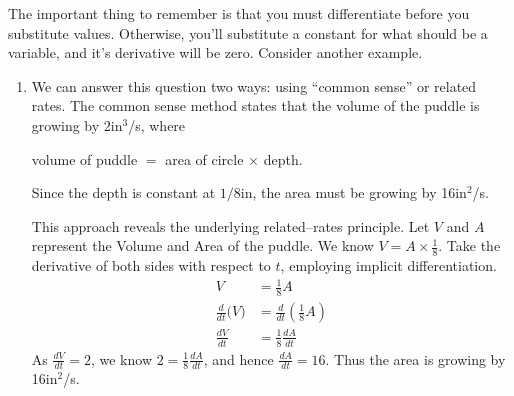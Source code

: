 The important thing to remember is that you must differentiate before you substitute values.  Otherwise, you'll substitute a constant for what should be a variable, and it's derivative will be zero.  Consider another example.\\

{\begin{enumerate}
\item We can answer this question two ways: using ``common sense'' or related rates. The common sense method states that the volume of the puddle is growing by $2$in$^3$/s, where 
	\begin{center} volume of puddle $=$ area of circle $\times$ depth.\end{center}
Since the depth is constant at $1/8$in, the area must be growing by 16in$^2$/s.

This approach reveals the underlying related--rates principle. Let $V$ and $A$ represent the Volume and Area of the puddle. We know $V= A\times \frac18$. Take the derivative of both sides with respect to $t$, employing implicit differentiation.
\begin{align*}
V &= \frac18A\\
\frac{d}{dt}\big(V\big) &= \frac{d}{dt}\left(\frac18A\right)\\
\frac{dV}{dt} &=	\frac18\frac{dA}{dt}
\end{align*} 
As $\frac{dV}{dt} = 2$, we know $2 = \frac18\frac{dA}{dt}$, and hence $\frac{dA}{dt} = 16$. Thus the area is growing by 16in$^2$/s.


\end{enumerate}}
